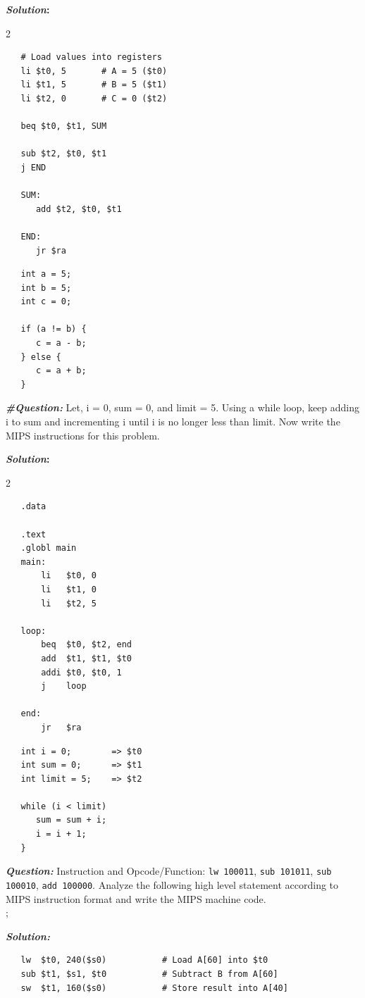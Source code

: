 \textbf{\textit{Solution}:}
\begin{multicols}{2}
   \noindent
   \raggedcolumns
   
\begin{verbatim}
   # Load values into registers
   li $t0, 5       # A = 5 ($t0)
   li $t1, 5       # B = 5 ($t1)
   li $t2, 0       # C = 0 ($t2)

   beq $t0, $t1, SUM 

   sub $t2, $t0, $t1
   j END

   SUM:
      add $t2, $t0, $t1

   END:
      jr $ra
\end{verbatim}
  
  \columnbreak

\begin{verbatim}
   int a = 5;
   int b = 5;
   int c = 0;

   if (a != b) {
      c = a - b;
   } else {
      c = a + b;
   }
\end{verbatim}
\end{multicols}




\textbf{\textit{\#Question:}}
Let, i = 0, sum = 0, and limit = 5.
Using a while loop, keep adding i to sum and incrementing i until i is no longer less than limit.
Now write the MIPS instructions for this problem.

\textbf{\textit{Solution}:}
\begin{multicols}{2}
\noindent
\raggedcolumns
   
\begin{verbatim}
   .data

   .text
   .globl main
   main:
       li   $t0, 0
       li   $t1, 0
       li   $t2, 5
   
   loop:
       beq  $t0, $t2, end
       add  $t1, $t1, $t0
       addi $t0, $t0, 1
       j    loop
   
   end:
       jr   $ra
\end{verbatim}
\columnbreak

\begin{verbatim}
   int i = 0;        => $t0
   int sum = 0;      => $t1
   int limit = 5;    => $t2

   while (i < limit) 
      sum = sum + i;
      i = i + 1;
   }
\end{verbatim}
\end{multicols}


\pagebreak
\textbf{\textit{Question:}}
Instruction and Opcode/Function: \texttt{lw 100011}, \texttt{sub 101011}, \texttt{sub 100010}, \texttt{add 100000}. Analyze the following high level statement according to MIPS instruction format and write the MIPS machine code.\\;

\textbf{\textit{Solution:}}
\begin{verbatim}
   lw  $t0, 240($s0)           # Load A[60] into $t0
   sub $t1, $s1, $t0           # Subtract B from A[60]
   sw  $t1, 160($s0)           # Store result into A[40]
\end{verbatim}